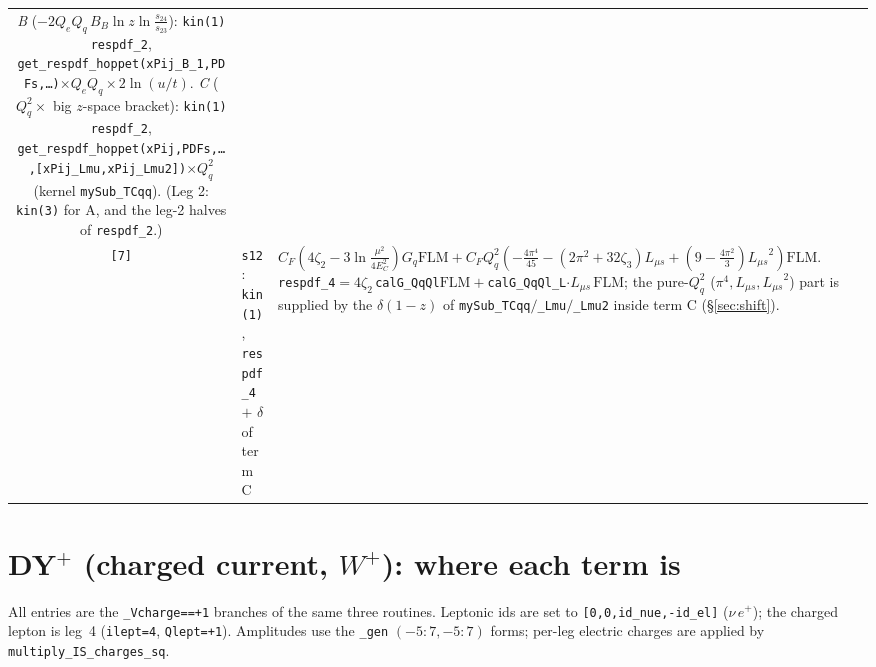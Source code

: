 \documentclass[11pt]{article}
\newcommand{\code}[1]{\texttt{#1}}
\newcommand{\FLM}{\ensuremath{\mathrm{FLM}}}
\newcommand{\Lms}{\ensuremath{L_{\mu s}}}
\newcommand{\zt}{\ensuremath{\zeta_2}}\newcommand{\ztt}{\ensuremath{\zeta_3}}
\begin{document}
\begin{center}
\begin{longtable}{@{}c p{4.7cm} p{8.7cm}@{}}
   \emph{B} ($-2Q_eQ_q\,B_B\ln z\ln\tfrac{s_{24}}{s_{23}}$): \code{kin(1) respdf\_2},
   \code{get\_respdf\_hoppet(xPij\_B\_1,PDFs,\dots)}$\times Q_eQ_q\times 2\ln(u/t)$.\newline
   \emph{C} ($Q_q^2\times$ big $z$-space bracket): \code{kin(1) respdf\_2},
   \code{get\_respdf\_hoppet(xPij,PDFs,\dots,[xPij\_Lmu,xPij\_Lmu2])}$\times Q_q^2$
   (kernel \code{mySub\_TCqq}).\newline
   (Leg 2: \code{kin(3)} for A, and the leg-2 halves of \code{respdf\_2}.)\\
\code{[7]} & \code{s12}: \code{kin(1)}, \code{respdf\_4} $+$ $\delta$ of term C
 & $C_F(4\zt-3\ln\tfrac{\mu^2}{4E_C^2})G_q\FLM
   +C_FQ_q^2(-\tfrac{4\pi^4}{45}-(2\pi^2{+}32\ztt)\Lms+(9{-}\tfrac{4\pi^2}{3})\Lms^2)\FLM$.
   \code{respdf\_4}$=4\zt\,$\code{calG\_QqQl}$\FLM+$\code{calG\_QqQl\_L}$\cdot\Lms\,\FLM$;
   the pure-$Q_q^2$ ($\pi^4,\Lms,\Lms^2$) part is supplied by the $\delta(1-z)$ of
   \code{mySub\_TCqq}$/$\code{\_Lmu}$/$\code{\_Lmu2} inside term C (\S\ref{sec:shift}).\\
\bottomrule
\end{longtable}
\end{center}

\section{DY${}^+$ (charged current, $W^+$): where each term is}
\label{sec:dyp}

All entries are the \code{\_Vcharge==+1} branches of the same three routines. Leptonic ids
are set to \code{[0,0,id\_nue,-id\_el]} ($\nu\,e^+$); the charged lepton is leg~4
(\code{ilept=4}, \code{Qlept=+1}). Amplitudes use the \code{\_gen} $(-5{:}7,-5{:}7)$ forms;
per-leg electric charges are applied by \code{multiply\_IS\_charges\_sq}.
\end{document}

